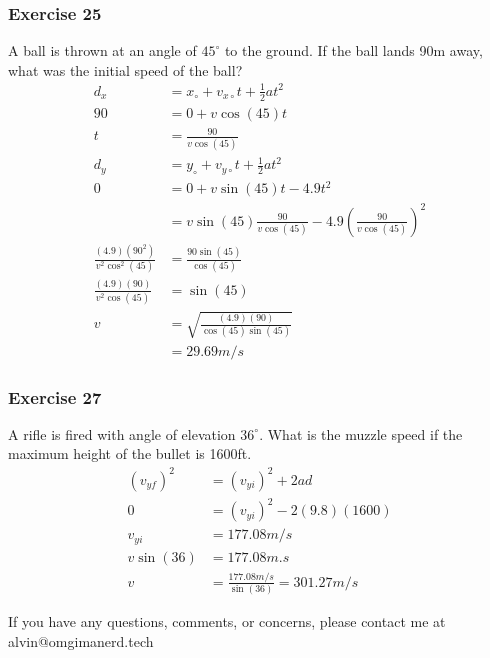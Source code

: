 \documentclass[letterpaper, 12pt]{math}
\begin{document}
\subsubsection*{Exercise 25}
A ball is thrown at an angle of \( 45^{\circ} \) to the ground. If the ball
lands 90m away, what was the initial speed of the ball?
\begin{align*}
  d_x &= x_{\circ}+v_{x\circ}t+\frac{1}{2}at^2 \\
  90 &= 0+v\cos(45)t \\
  t &= \frac{90}{v\cos(45)} \\
  d_y &= y_{\circ}+v_{y\circ}t+\frac{1}{2}at^2 \\
  0 &= 0+v\sin(45)t-4.9t^2 \\
  &= v\sin(45)\frac{90}{v\cos(45)}-4.9(\frac{90}{v\cos(45)})^2 \\
  \frac{(4.9)(90^2)}{v^2\cos^2(45)} &= \frac{90\sin(45)}{\cos(45)} \\
  \frac{(4.9)(90)}{v^2\cos(45)} &= \sin(45) \\
  v &= \sqrt{\frac{(4.9)(90)}{\cos(45)\sin(45)}} \\
  &= 29.69m/s
\end{align*}

\subsubsection*{Exercise 27}
A rifle is fired with angle of elevation \( 36^{\circ} \). What is the muzzle
speed if the maximum height of the bullet is 1600ft.
\begin{align*}
  (v_{yf})^2 &= (v_{yi})^2+2ad \\
  0 &= (v_{yi})^2-2(9.8)(1600) \\
  v_{yi} &= 177.08m/s \\
  v\sin(36) &= 177.08m.s \\
  v &= \frac{177.08m/s}{\sin(36)} = 301.27m/s
\end{align*}

\begin{center}
  If you have any questions, comments, or concerns, please contact me at
  alvin@omgimanerd.tech
\end{center}
\end{document}
